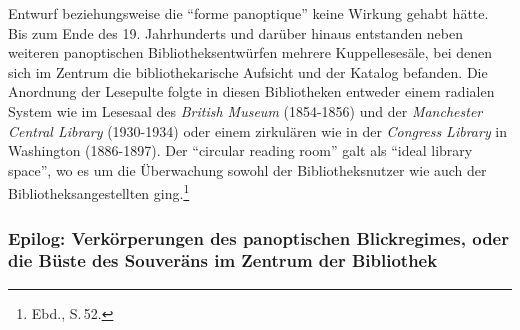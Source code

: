 Entwurf beziehungsweise die \enquote{forme panoptique} keine Wirkung
gehabt hätte. Bis zum Ende des 19. Jahrhunderts und darüber hinaus
entstanden neben weiteren panoptischen Bibliotheksentwürfen mehrere
Kuppellesesäle, bei denen sich im Zentrum die bibliothekarische Aufsicht
und der Katalog befanden. Die Anordnung der Lesepulte folgte in diesen
Bibliotheken entweder einem radialen System wie im Lesesaal des
\emph{British Museum} (1854-1856) und der \emph{Manchester Central
Library} (1930-1934) oder einem zirkulären wie in der \emph{Congress
Library} in Washington (1886-1897). Der \enquote{circular reading room}
galt als \enquote{ideal library space}, wo es um die Überwachung sowohl
der Bibliotheksnutzer wie auch der Bibliotheksangestellten
ging.\footnote{Ebd., S.\,52.}

\subsubsection{Epilog: Verkörperungen des panoptischen Blickregimes,
oder die Büste des Souveräns im Zentrum der
Bibliothek}\label{epilog-verkuxf6rperungen-des-panoptischen-blickregimes-oder-die-buxfcste-des-souveruxe4ns-im-zentrum-der-bibliothek}

